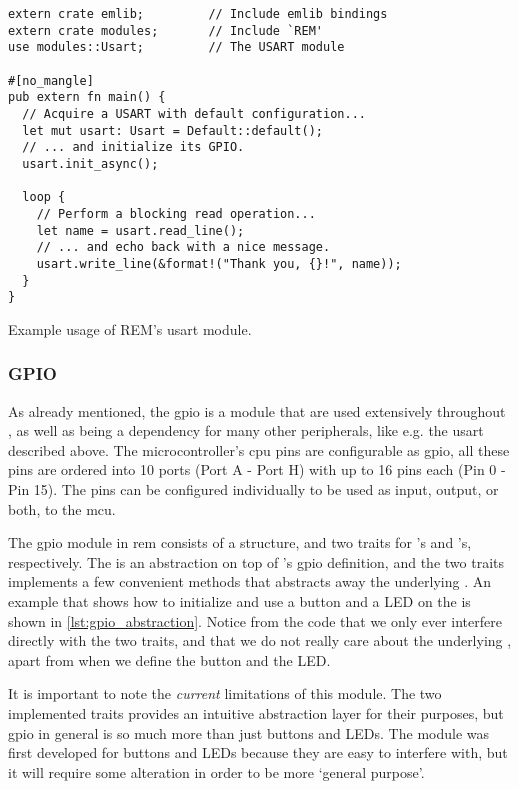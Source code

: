 \begin{listing}[H]
  \begin{verbatim}
extern crate emlib;         // Include emlib bindings
extern crate modules;       // Include `REM'
use modules::Usart;         // The USART module

#[no_mangle]
pub extern fn main() {
  // Acquire a USART with default configuration...
  let mut usart: Usart = Default::default();
  // ... and initialize its GPIO.
  usart.init_async();

  loop {
    // Perform a blocking read operation...
    let name = usart.read_line();
    // ... and echo back with a nice message.
    usart.write_line(&format!("Thank you, {}!", name));
  }
}
  \end{verbatim}
  \caption{Example usage of \gls{REM}'s \gls{usart} module.}
  \label{lst:usart_abstraction}
\end{listing}

\subsubsection{GPIO} %
\label{ssub:gpio}

As already mentioned, the \gls{gpio} is a module that are used extensively throughout {\emlib}, as well as being a dependency for many other peripherals, like e.g. the \gls{usart} described above.
The microcontroller's \gls{cpu} pins are configurable as \gls{gpio}, all these pins are ordered into 10 ports (Port A - Port H) with up to 16 pins each (Pin 0 - Pin 15).
The pins can be configured individually to be used as input, output, or both, to the \gls{mcu}.

The \gls{gpio} module in \gls{rem} consists of a  structure, and two traits for 's and 's, respectively.
The  is an abstraction on top of {\emlib}'s \gls{gpio} definition, and the two traits implements a few convenient methods that abstracts away the underlying .
An example that shows how to initialize and use a button and a LED on the {\STK} is shown in \autoref{lst:gpio_abstraction}.
Notice from the code that we only ever interfere directly with the two traits, and that we do not really care about the underlying , apart from when we define the button and the LED.

It is important to note the \emph{current} limitations of this module.
The two implemented traits provides an intuitive abstraction layer for their purposes, but \gls{gpio} in general is so much more than just buttons and LEDs.
The module was first developed for buttons and LEDs because they are easy to interfere with, but it will require some alteration in order to be more `general purpose'.

